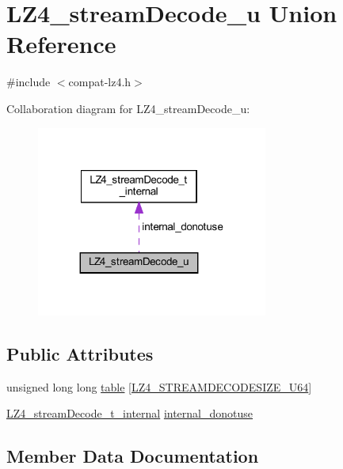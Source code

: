 \hypertarget{union_l_z4__stream_decode__u}{}\section{L\+Z4\+\_\+stream\+Decode\+\_\+u Union Reference}
\label{union_l_z4__stream_decode__u}


{\ttfamily \#include $<$compat-\/lz4.\+h$>$}



Collaboration diagram for L\+Z4\+\_\+stream\+Decode\+\_\+u\+:
\nopagebreak
\begin{figure}[H]
\begin{center}
\leavevmode
\includegraphics[width=215pt]{union_l_z4__stream_decode__u__coll__graph}
\end{center}
\end{figure}
\subsection*{Public Attributes}
\begin{DoxyCompactItemize}
\item 
unsigned long long \hyperlink{union_l_z4__stream_decode__u_ae208ed637966bd87b22917d46987af09}{table} \mbox{[}\hyperlink{compat-lz4_8h_a414ecb38e0607f239de5ebca5a5beef5}{L\+Z4\+\_\+\+S\+T\+R\+E\+A\+M\+D\+E\+C\+O\+D\+E\+S\+I\+Z\+E\+\_\+\+U64}\mbox{]}
\item 
\hyperlink{struct_l_z4__stream_decode__t__internal}{L\+Z4\+\_\+stream\+Decode\+\_\+t\+\_\+internal} \hyperlink{union_l_z4__stream_decode__u_a4ee7ad9d157b314d88fd901d35116c76}{internal\+\_\+donotuse}
\end{DoxyCompactItemize}


\subsection{Member Data Documentation}
\hypertarget{union_l_z4__stream_decode__u_a4ee7ad9d157b314d88fd901d35116c76}{}
